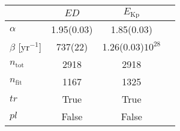 \begin{tabular}{lccr}
\hline
  &        $ED$ &      $E_\mathrm{Kp}$ \\
\hline
$\alpha$            &  1.95(0.03) &           1.85(0.03) \\
$\beta$ [yr$^{-1}$] &     737(22) &  1.26(0.03)$10^{28}$ \\
$n_\mathrm{tot}$    &        2918 &                 2918 \\
$n_\mathrm{fit}$    &        1167 &                 1325 \\
$tr$                &        True &                 True \\
$pl$                &       False &                False \\
\hline

\end{tabular}
